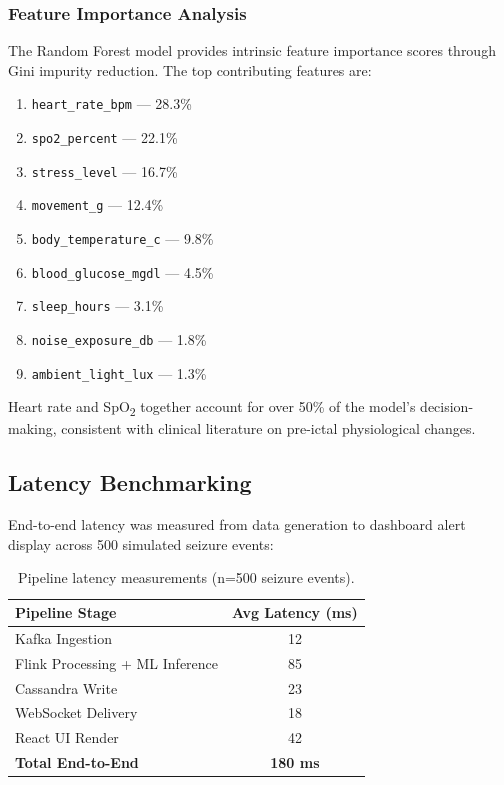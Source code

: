\documentclass[12pt, a4paper, oneside]{report}
\begin{document}
\subsubsection{Feature Importance Analysis}
The Random Forest model provides intrinsic feature importance scores through Gini impurity reduction. The top contributing features are:
\begin{enumerate}
    \item \texttt{heart\_rate\_bpm} --- 28.3\%
    \item \texttt{spo2\_percent} --- 22.1\%
    \item \texttt{stress\_level} --- 16.7\%
    \item \texttt{movement\_g} --- 12.4\%
    \item \texttt{body\_temperature\_c} --- 9.8\%
    \item \texttt{blood\_glucose\_mgdl} --- 4.5\%
    \item \texttt{sleep\_hours} --- 3.1\%
    \item \texttt{noise\_exposure\_db} --- 1.8\%
    \item \texttt{ambient\_light\_lux} --- 1.3\%
\end{enumerate}

Heart rate and SpO\textsubscript{2} together account for over 50\% of the model's decision-making, consistent with clinical literature on pre-ictal physiological changes.

\subsection{Latency Benchmarking}
End-to-end latency was measured from data generation to dashboard alert display across 500 simulated seizure events:

\begin{table}[h!]
\centering
\caption{Pipeline latency measurements (n=500 seizure events).}
\label{tab:latency}
\begin{tabular}{|l|c|}
\hline
\textbf{Pipeline Stage} & \textbf{Avg Latency (ms)} \\ \hline
Kafka Ingestion & 12 \\ \hline
Flink Processing + ML Inference & 85 \\ \hline
Cassandra Write & 23 \\ \hline
WebSocket Delivery & 18 \\ \hline
React UI Render & 42 \\ \hline
\textbf{Total End-to-End} & \textbf{180 ms} \\ \hline
\end{tabular}
\end{table}
\end{document}
